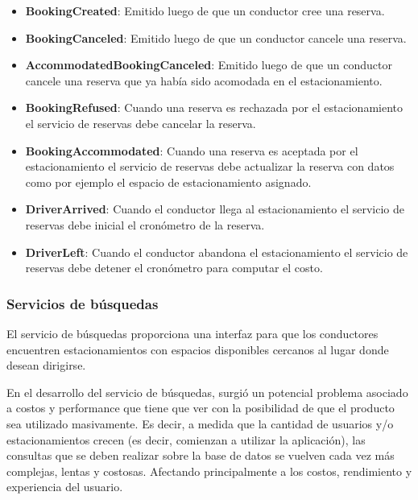 \begin{itemize}
    \item \textbf{BookingCreated}: Emitido luego de que un conductor cree una reserva.
    \item \textbf{BookingCanceled}: Emitido luego de que un conductor cancele una reserva.
    \item \textbf{AccommodatedBookingCanceled}: Emitido luego de que un conductor cancele una reserva que ya había sido acomodada en el estacionamiento.
\end{itemize}

\begin{itemize}
    \item \textbf{BookingRefused}: Cuando una reserva es rechazada por el estacionamiento el servicio de reservas debe cancelar la reserva.
    \item \textbf{BookingAccommodated}: Cuando una reserva es aceptada por el estacionamiento el servicio de reservas debe actualizar la reserva con datos como por ejemplo el espacio de estacionamiento asignado.
    \item \textbf{DriverArrived}: Cuando el conductor llega al estacionamiento el servicio de reservas debe inicial el cronómetro de la reserva.
    \item \textbf{DriverLeft}: Cuando el conductor abandona el estacionamiento el servicio de reservas debe detener el cronómetro para computar el costo.
\end{itemize}



\subsubsection{Servicios de búsquedas}
El servicio de búsquedas proporciona una interfaz para que los conductores encuentren estacionamientos con espacios disponibles cercanos al lugar donde desean dirigirse.

En el desarrollo del servicio de búsquedas, surgió un potencial problema asociado a costos y performance que tiene que ver con la posibilidad de que el producto sea utilizado masivamente. Es decir, a medida que la cantidad de usuarios y/o estacionamientos crecen (es decir, comienzan a utilizar la aplicación), las consultas que se deben realizar sobre la base de datos se vuelven cada vez más complejas, lentas y costosas. Afectando principalmente a los costos, rendimiento y experiencia del usuario.

